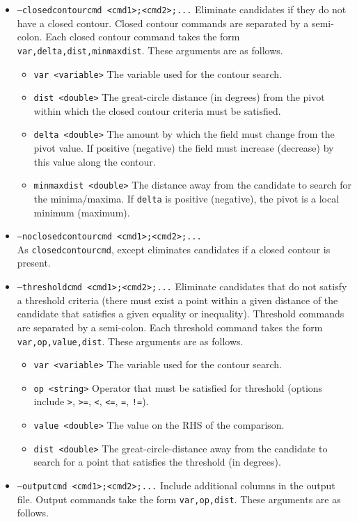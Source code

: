 \documentclass{article}
\begin{document}
\begin{itemize}
\item[] \texttt{--closedcontourcmd <cmd1>;<cmd2>;...} Eliminate candidates if they do not have a closed contour.  Closed contour commands are separated by a semi-colon.  Each closed contour command takes the form \texttt{var,delta,dist,minmaxdist}.  These arguments are as follows.
\begin{itemize}
\item[] \texttt{var <variable>}  The variable used for the contour search.
\item[] \texttt{dist <double>}  The great-circle distance (in degrees) from the pivot within which the closed contour criteria must be satisfied.
\item[] \texttt{delta <double>}  The amount by which the field must change from the pivot value.  If positive (negative) the field must increase (decrease) by this value along the contour.
\item[] \texttt{minmaxdist <double>}  The distance away from the candidate to search for the minima/maxima.  If \texttt{delta} is positive (negative), the pivot is a local minimum (maximum).
\end{itemize}
\item[] \texttt{--noclosedcontourcmd <cmd1>;<cmd2>;...} \\ As \texttt{closedcontourcmd}, except eliminates candidates if a closed contour is present.
\item[] \texttt{--thresholdcmd <cmd1>;<cmd2>;...}  Eliminate candidates that do not satisfy a threshold criteria (there must exist a point within a given distance of the candidate that satisfies a given equality or inequality).  Threshold commands are separated by a semi-colon.  Each threshold command takes the form \texttt{var,op,value,dist}.  These arguments are as follows.
\begin{itemize}
\item[] \texttt{var <variable>}  The variable used for the contour search.
\item[] \texttt{op <string>}  Operator that must be satisfied for threshold (options include \texttt{>}, \texttt{>=}, \texttt{<}, \texttt{<=}, \texttt{=}, \texttt{!=}).
\item[] \texttt{value <double>}  The value on the RHS of the comparison.
\item[] \texttt{dist <double>}  The great-circle-distance away from the candidate to search for a point that satisfies the threshold (in degrees).
\end{itemize}
\item[] \texttt{--outputcmd <cmd1>;<cmd2>;...}  Include additional columns in the output file.  Output commands take the form \texttt{var,op,dist}. These arguments are as follows.

\end{itemize}
\end{document}
